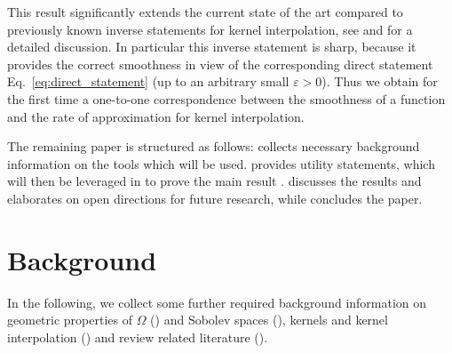 \documentclass[a4paper, 10pt]{article}
\begin{document}
This result significantly extends the current state of the art compared to previously known inverse statements for kernel interpolation, 
see  and  for a detailed discussion.
In particular this inverse statement  is sharp, 
because it provides the correct smoothness in view of the corresponding direct statement Eq.~\eqref{eq:direct_statement} (up to an arbitrary small $\varepsilon > 0$).
Thus we obtain for the first time a one-to-one correspondence between the smoothness of a function and the rate of approximation for kernel interpolation.



%
%
%
%
%
%
%
%



%
%
%
%
%

%
%
%
%
%
%
%
%
%
%
%
%
%
%
%
%
%
%
%
%
%
%
%








%
%
%
%
%
%
%
%
%
%
%


%


%
%
%
%
%
%
%
%
%
%
%
%
%

The remaining paper is structured as follows: 
 collects necessary background information on the tools which will be used. 
 provides utility statements, 
which will then be leveraged in  to prove the main result .
%
%
 discusses the results and elaborates on open directions for future research,
while  concludes the paper.




%


%
%
%
%
%
%
%
%
%
%
%
%
%
%
%
%
%
%
%
%
%
%
%
%
%
%
%
%
%
%
%
%
%
%
%
%
%




\section{Background}
\label{sec:background}
%

In the following, we collect some further required background information on geometric properties of $\Omega$ () and Sobolev spaces (), 
kernels and kernel interpolation () 
and review related literature ().
\end{document}

